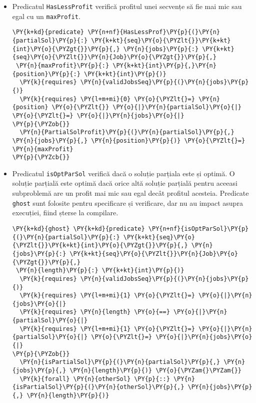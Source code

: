 \begin{itemize}
    \item Predicatul \texttt{HasLessProfit} verifică profitul unei secvențe să fie mai mic sau egal cu un \texttt{maxProfit}. 
    \begin{Verbatim}[commandchars=\\\{\}, fontsize=\footnotesize]
\PY{k+kd}{predicate} \PY{n+nf}{HasLessProf}\PY{p}{(}\PY{n}{partialSol}\PY{p}{:} \PY{k+kt}{seq}\PY{o}{\PYZlt{}}\PY{k+kt}{int}\PY{o}{\PYZgt{}}\PY{p}{,} \PY{n}{jobs}\PY{p}{:} \PY{k+kt}{seq}\PY{o}{\PYZlt{}}\PY{n}{Job}\PY{o}{\PYZgt{}}\PY{p}{,}  
 \PY{n}{maxProfit}\PY{p}{:} \PY{k+kt}{int}\PY{p}{,}\PY{n}{position}\PY{p}{:} \PY{k+kt}{int}\PY{p}{)}
  \PY{k}{requires} \PY{n}{validJobsSeq}\PY{p}{(}\PY{n}{jobs}\PY{p}{)}
  \PY{k}{requires} \PY{l+m+mi}{0} \PY{o}{\PYZlt{}=} \PY{n}{position} \PY{o}{\PYZlt{}} \PY{o}{|}\PY{n}{partialSol}\PY{o}{|} \PY{o}{\PYZlt{}=} \PY{o}{|}\PY{n}{jobs}\PY{o}{|}
\PY{p}{\PYZob{}}
  \PY{n}{PartialSolProfit}\PY{p}{(}\PY{n}{partialSol}\PY{p}{,} \PY{n}{jobs}\PY{p}{,} \PY{n}{position}\PY{p}{)} \PY{o}{\PYZlt{}=} \PY{n}{maxProfit}
\PY{p}{\PYZcb{}}
\end{Verbatim}
    \item Predicatul \texttt{isOptParSol} verifică dacă o soluție parțiala este și optimă. O soluție parțială este optimă dacă orice altă soluție parțială pentru aceeasi subproblemă are un profit mai mic sau egal decât profitul acesteia. Predicate \texttt{ghost} sunt folosite pentru specificare și verificare, dar nu au impact asupra execuției, fiind șterse la compilare. 
    \begin{Verbatim}[commandchars=\\\{\}, fontsize=\footnotesize]
\PY{k+kd}{ghost} \PY{k+kd}{predicate} \PY{n+nf}{isOptParSol}\PY{p}{(}\PY{n}{partialSol}\PY{p}{:} \PY{k+kt}{seq}\PY{o}{\PYZlt{}}\PY{k+kt}{int}\PY{o}{\PYZgt{}}\PY{p}{,} \PY{n}{jobs}\PY{p}{:} \PY{k+kt}{seq}\PY{o}{\PYZlt{}}\PY{n}{Job}\PY{o}{\PYZgt{}}\PY{p}{,}
 \PY{n}{length}\PY{p}{:} \PY{k+kt}{int}\PY{p}{)}
  \PY{k}{requires} \PY{n}{validJobsSeq}\PY{p}{(}\PY{n}{jobs}\PY{p}{)}
  \PY{k}{requires} \PY{l+m+mi}{1} \PY{o}{\PYZlt{}=} \PY{o}{|}\PY{n}{jobs}\PY{o}{|} 
  \PY{k}{requires} \PY{n}{length} \PY{o}{==} \PY{o}{|}\PY{n}{partialSol}\PY{o}{|}
  \PY{k}{requires} \PY{l+m+mi}{1} \PY{o}{\PYZlt{}=} \PY{o}{|}\PY{n}{partialSol}\PY{o}{|} \PY{o}{\PYZlt{}=} \PY{o}{|}\PY{n}{jobs}\PY{o}{|}
\PY{p}{\PYZob{}}
  \PY{n}{isPartialSol}\PY{p}{(}\PY{n}{partialSol}\PY{p}{,} \PY{n}{jobs}\PY{p}{,} \PY{n}{length}\PY{p}{)} \PY{o}{\PYZam{}\PYZam{}}
  \PY{k}{forall} \PY{n}{otherSol} \PY{p}{::} \PY{n}{isPartialSol}\PY{p}{(}\PY{n}{otherSol}\PY{p}{,} \PY{n}{jobs}\PY{p}{,} \PY{n}{length}\PY{p}{)}

\end{Verbatim}
\end{itemize}
